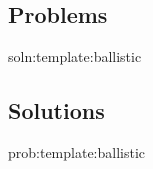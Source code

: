 

\subsection{Problems}
\begin{problem}{soln:template:ballistic}{\label{prob:template:ballistic} 

}
\end{problem}

\newpage
\subsection{Solutions}
\begin{solution}{prob:template:ballistic}\label{soln:template:ballistic}

\end{solution}

